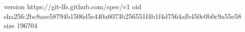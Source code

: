 version https://git-lfs.github.com/spec/v1
oid sha256:2bc8aee58794b1506d5e440a6073b256551f4b1f4d7564afb450c0b0c9a55e58
size 196704
